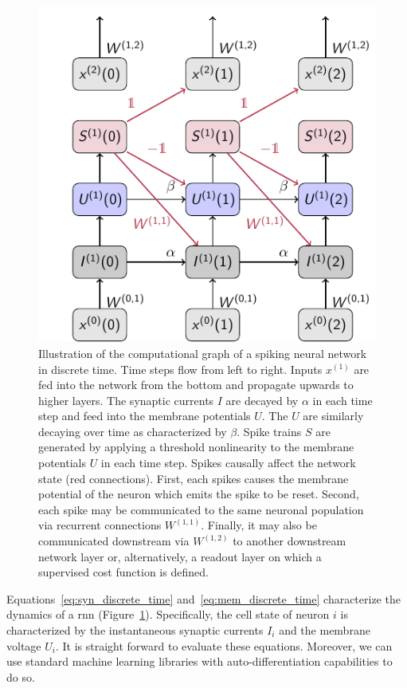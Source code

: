 \documentclass[journal,onecolumn,11pt]{IEEEtran}
\begin{document}
\begin{figure}
    \centering
    \includegraphics{figures/snn_graph.pdf}
	\caption{Illustration of the computational graph of a spiking neural network
  in discrete time. Time steps flow from left to right. Inputs $x^{(1)}$ are fed
	into the network from the bottom and propagate upwards to higher layers. The
	synaptic currents $I$ are decayed by $\alpha$ in each time step and feed
	into the membrane potentials $U$. The $U$ are similarly decaying over time
	as characterized by $\beta$. Spike trains $S$ are generated by applying a
	threshold nonlinearity to the membrane potentials $U$ in each time step.
	Spikes causally affect the network state (red connections).  First, each
	spikes causes the membrane potential of the neuron which emits the spike to
	be reset. Second, each spike may be communicated to the same neuronal
	population via recurrent connections $W^{(1,1)}$.  Finally, it may also be
	communicated downstream via $W^{(1,2)}$ to another downstream network layer
	or, alternatively, a readout layer on which a supervised cost function is
	defined.}
    \label{fig:snn_computational_graph}
\end{figure}

Equations~\eqref{eq:syn_discrete_time} and~\eqref{eq:mem_discrete_time}
characterize the dynamics of a \gls{rnn}
(Figure~\ref{fig:snn_computational_graph}).  Specifically, the cell state of
neuron $i$ is characterized by the instantaneous synaptic currents $I_i$ and the
membrane voltage $U_i$.  
It is straight forward to evaluate these equations. Moreover, we can use
standard machine learning libraries with auto-differentiation capabilities to do so.
\end{document}

